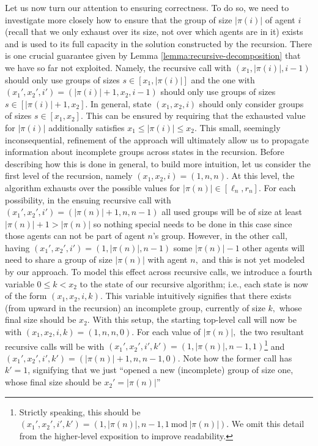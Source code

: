 \documentclass[a4paper]{article}
\newcommand{\modulus}[1]{\vert #1 \vert}
\newcommand{\Mod}[1]{\ \mathrm{mod}\ #1}
\begin{document}
Let us now turn our attention to ensuring correctness. To do so, we need to investigate more closely how to ensure that the group of size $\modulus{\pi(i)}$ of agent $i$ (recall that we only exhaust over its size, not over which agents are in it) exists and is used to its full capacity in the solution constructed by the recursion. There is one crucial guarantee given by Lemma \ref{lemma:recursive-decomposition} that we have so far not exploited. Namely, the recursive call with $(x_1, \modulus{\pi(i)}, i - 1)$ should only use groups of sizes $s \in [x_1, \modulus{\pi(i)}]$ and the one with $(x_1', x_2', i') = (\modulus{\pi(i)} + 1, x_2, i - 1)$ should only use groups of sizes $s \in [\modulus{\pi(i)} + 1, x_2].$ In general, state $(x_1, x_2, i)$ should only consider groups of sizes $s \in [x_1, x_2].$ This can be ensured by requiring that the exhausted value for $\modulus{\pi(i)}$ additionally satisfies $x_1 \leq \modulus{\pi(i)} \leq x_2.$ This small, seemingly inconsequential, refinement of the approach will ultimately allow us to propagate information about incomplete groups across states in the recursion. Before describing how this is done in general, to build more intuition, let us consider the first level of the recursion, namely $(x_1, x_2, i) = (1, n, n).$ At this level, the algorithm exhausts over the possible values for $\modulus{\pi(n)} \in [\ell_n, r_n].$ For each possibility, in the ensuing recursive call with $(x_1', x_2', i') = (\modulus{\pi(n)} + 1, n, n - 1)$ all used groups will be of size at least $\modulus{\pi(n)} + 1 > \modulus{\pi(n)}$ so nothing special needs to be done in this case since those agents can not be part of agent $n$'s group. However, in the other call, having $(x_1', x_2', i') = (1, \modulus{\pi(n)}, n - 1)$ some $\modulus{\pi(n)} - 1$ other agents will need to share a group of size $\modulus{\pi(n)}$ with agent $n,$ and this is not yet modeled by our approach. To model this effect across recursive calls, we introduce a fourth variable $0 \leq k < x_2$ to the state of our recursive algorithm; i.e., each state is now of the form $(x_1, x_2, i, k).$ This variable intuitively signifies that there exists (from upward in the recursion) an incomplete group, currently of size $k,$ whose final size should be $x_2.$ With this setup, the starting top-level call will now be with $(x_1, x_2, i, k) = (1, n, n, 0).$ For each value of $\modulus{\pi(n)},$ the two resultant recursive calls will be with $(x_1', x_2', i', k') = (1, \modulus{\pi(n)}, n - 1, 1)$\footnote{Strictly speaking, this should be $(x_1', x_2', i', k') = (1, \modulus{\pi(n)}, n - 1, 1 \Mod {\modulus{\pi(n)}})$. We omit this detail from the higher-level exposition to improve readability.} and $(x_1', x_2', i', k') = (\modulus{\pi(n)} + 1, n, n - 1, 0).$ Note how the former call has $k' = 1$,  signifying that we just ``opened a new (incomplete) group of size one, whose final size should be $x_2' = \modulus{\pi(n)}$''
\end{document}
